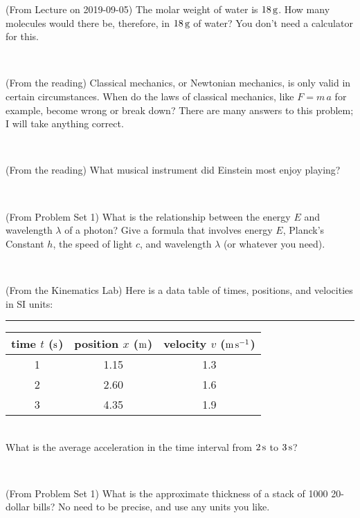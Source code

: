 \documentclass[12pt, letterpaper]{article}
\begin{document}
\begin{problem} (From Lecture on 2019-09-05)
The molar weight of water is $18\,\mathrm{g}$. How many molecules would there
be, therefore, in $18\,\mathrm{g}$ of water? You don't need a calculator for
this.
\end{problem}


\vfill ~

\begin{problem} (From the reading)
Classical mechanics, or Newtonian mechanics, is only valid in certain
circumstances. When do the laws of classical mechanics, like $F =
m\,a$ for example, become wrong or break down? There are many answers
to this problem; I will take anything correct.
\end{problem}


\vfill ~

\begin{problem} (From the reading)
What musical instrument did Einstein most enjoy playing?
\end{problem}


\vfill ~


\clearpage


\begin{problem} (From Problem Set 1)
What is the relationship between the energy $E$ and wavelength
$\lambda$ of a photon? Give a formula that involves energy $E$,
Planck's Constant $h$, the speed of light $c$, and wavelength
$\lambda$ (or whatever you need).
\end{problem}

\vfill ~

\begin{problem} (From the Kinematics Lab)
Here is a data table of times, positions, and velocities in SI units:\\
\rule{1.0in}{0pt}\begin{tabular}{c|c|c}
time $t$ ($\mathrm{s}$) & position $x$ ($\mathrm{m}$) & velocity $v$ ($\mathrm{m}\,\mathrm{s}^{-1}$) \\
\hline
1 & 1.15 & 1.3 \\
2 & 2.60 & 1.6 \\
3 & 4.35 & 1.9 \\
\hline
\end{tabular}\\
What is the average acceleration in the time interval from $2\,\mathrm{s}$ to $3\,\mathrm{s}$?
\end{problem}


\vfill ~

\begin{problem} (From Problem Set 1)
What is the approximate thickness of a stack of 1000 20-dollar bills?
No need to be precise, and use any units you like.
\end{problem}
\end{document}
